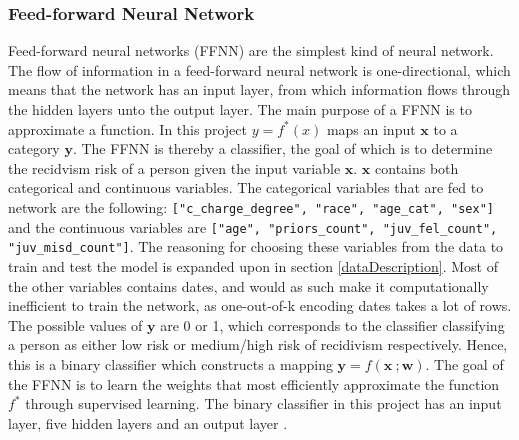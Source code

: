 \documentclass[11pt, fleqn, titlepage]{article}
\begin{document}
	\subsubsection{Feed-forward Neural Network}
	Feed-forward neural networks (FFNN) are the simplest kind of neural network. The flow of information in a feed-forward neural network is one-directional, which means that the network has an input layer, from which information flows through the hidden layers unto the output layer. The main purpose of a FFNN is to approximate a function. In this project $ y = f^*(x) $ maps an input $ \mathbf x $ to a category $ \mathbf y $. The FFNN is thereby a classifier, the goal of which is to determine the recidvism risk of a person given the input variable $ \mathbf x $. $ \mathbf x $ contains both categorical and continuous variables. The categorical variables that are fed to network are the following: \texttt{["c\_charge\_degree", "race", "age\_cat", "sex"]} and the continuous variables are \texttt{["age", "priors\_count", "juv\_fel\_count", "juv\_misd\_count"]}. The reasoning for choosing these variables from the data to train and test the model is expanded upon in section \ref{dataDescription}. Most of the other variables contains dates, and would as such make it computationally inefficient to train the network, as one-out-of-k encoding dates takes a lot of rows. The possible values of $ \mathbf y $ are 0 or 1, which corresponds to the classifier classifying a person as either low risk or medium/high risk of recidivism respectively. Hence, this is a binary classifier which constructs a mapping $ \mathbf y = f(\mathbf x \ ; \mathbf w) $. The goal of the FFNN is to learn the weights that most efficiently approximate the function $ f^* $ through supervised learning. The binary classifier in this project has an input layer, five hidden layers and an output layer \cite{dl}.
	
\end{document}
